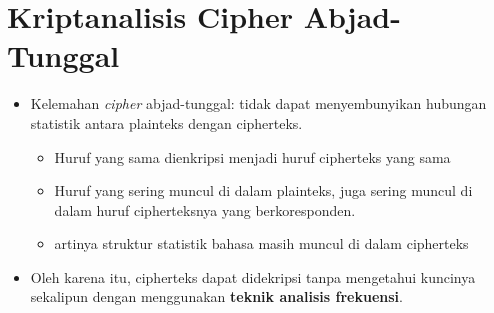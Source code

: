 \documentclass{article}
\begin{document}

\section*{Kriptanalisis Cipher Abjad-Tunggal}

\begin{itemize}
    \item Kelemahan \textit{cipher} abjad-tunggal: tidak dapat menyembunyikan hubungan statistik antara plainteks dengan cipherteks.
    \begin{itemize}
        \item Huruf yang sama dienkripsi menjadi huruf cipherteks yang sama
        \item Huruf yang sering muncul di dalam plainteks, juga sering muncul di dalam huruf cipherteksnya yang berkoresponden.
        \item artinya struktur statistik bahasa masih muncul di dalam cipherteks
    \end{itemize}
    \item Oleh karena itu, cipherteks dapat didekripsi tanpa mengetahui kuncinya sekalipun dengan menggunakan \textbf{teknik analisis frekuensi}.
\end{itemize}
\end{document}
